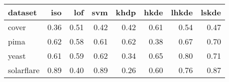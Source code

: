 \begin{table}[ht]
\centering
\begin{tabular}{lrrrrrrr}
  \hline
dataset & iso & lof & svm & khdp & hkde & lhkde & lskde \\ 
  \hline
cover & 0.36 & 0.51 & 0.42 & 0.42 & 0.61 & 0.54 & 0.47 \\ 
  pima & 0.62 & 0.58 & 0.61 & 0.62 & 0.38 & 0.67 & 0.70 \\ 
  yeast & 0.61 & 0.59 & 0.62 & 0.34 & 0.65 & 0.80 & 0.71 \\ 
  solarflare & 0.89 & 0.40 & 0.89 & 0.26 & 0.60 & 0.76 & 0.87 \\ 
   \hline
\end{tabular}
\end{table}

